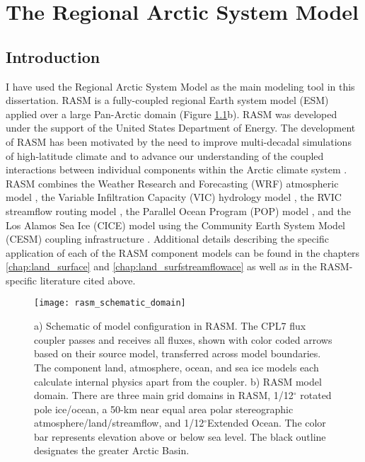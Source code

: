 
\chapter{The Regional Arctic System Model}
\label{chap:rasm}

\section{Introduction}

I have used the Regional Arctic System Model as the main modeling tool in this dissertation.
RASM is a fully-coupled regional Earth system model (ESM) applied over a large Pan-Arctic domain (Figure \ref{fig:rasm}b).
RASM was developed under the support of the United States Department of Energy.
The development of RASM has been motivated by the need to improve multi-decadal simulations of high-latitude climate and to advance our understanding of the coupled interactions between individual components within the Arctic climate system \citep{Roberts_2010}.
RASM combines the Weather Research and Forecasting (WRF) atmospheric model \citep{Skamarock_2008,DuVivier_2016,Cassano_2016}, the Variable Infiltration Capacity (VIC) hydrology model \citep{Liang_1994,Liang_1996,Hamman_2016a}, the RVIC streamflow routing model \citep{Lohmann_1996,Hamman_2016b}, the Parallel Ocean Program (POP) model \citep{Smith_2010,Roberts_2015a}, and the Los Alamos Sea Ice (CICE) model \citep{Hunke2013,Hunke2015,Roberts_2015a} using the Community Earth System Model (CESM) coupling infrastructure \citep[CPL7; ][]{Craig_2012,Roberts_2015a}.
Additional details describing the specific application of each of the RASM component models can be found in the chapters \ref{chap:land_surface} and \ref{chap:land_surfstreamflowace} as well as in the RASM-specific literature cited above.

\begin{figure}
  \centering
  \texttt{[image: rasm\_schematic\_domain]}
  \caption{a) Schematic of model configuration in RASM.
  The CPL7 flux coupler passes and receives all fluxes, shown with color coded arrows based on their source model, transferred across model boundaries.
  The component land, atmosphere, ocean, and sea ice models each calculate internal physics apart from the coupler.
  b) RASM model domain.
  There are three main grid domains in RASM, 1/12$^{\circ}$ rotated pole ice/ocean, a 50-km near equal area polar stereographic atmosphere/land/streamflow, and 1/12$^{\circ}$Extended Ocean.
  The color bar represents elevation above or below sea level.
  The black outline designates the greater Arctic Basin.}
  \label{fig:rasm}
\end{figure}

